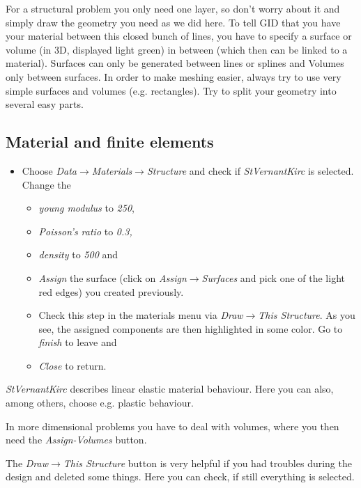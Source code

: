 For a structural problem you only need one layer, so don't worry about
it and simply draw the geometry you need as we did here. To tell GID
that you have your material between this closed bunch of lines, you
have to specify a surface or volume (in 3D, displayed light green)
in between (which then can be linked to a material). Surfaces can
only be generated between lines or splines and Volumes only between
surfaces. In order to make meshing easier, always try to use very
simple surfaces and volumes (e.g. rectangles). Try to split your geometry
into several easy parts.


\subsection{Material and finite elements}

\begin{itemize}
\item Choose \emph{Data$\to$Materials$\to$Structure} and check if \emph{StVernantKirc}
is selected. Change the

\begin{itemize}
\item \emph{young modulus} to \emph{250}, 
\item \emph{Poisson's ratio} to \emph{0.3, }
\item \emph{density} to \emph{500} and 
\item \emph{Assign} the surface (click on \emph{Assign$\to$Surfaces} and
pick one of the light red edges) you created previously. 
\item Check this step in the materials menu via \emph{Draw$\to$This Structure}.
As you see, the assigned components are then highlighted in some color.
Go to \emph{finish} to leave and
\item \emph{Close} to return.
\end{itemize}
\end{itemize}
\emph{StVernantKirc} describes linear elastic material behaviour.
Here you can also, among others, choose e.g. plastic behaviour.

In more dimensional problems you have to deal with volumes, where
you then need the \emph{Assign-Volumes} button.

The \emph{Draw$\to$This Structure} button is very helpful if you
had troubles during the design and deleted some things. Here you can
check, if still everything is selected.

